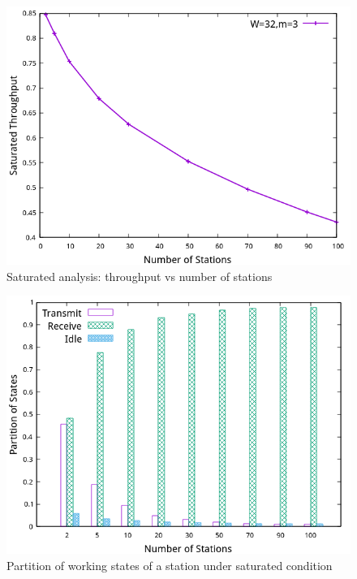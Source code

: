 \vspace*{0.5cm}

\begin{figure}[!h]
\centering
\includegraphics[scale=0.85]{./figure/chp1/n_throughput.png}
\caption{Saturated analysis: throughput vs number of stations}
\label{fig_thp_legacy}
\end{figure}
\vspace*{0.5cm}

\begin{figure}[!h]
\centering
\includegraphics[scale=0.85]{./figure/chp1/n_state_partition.png}
\caption{Partition of working states of a station under saturated condition}
\label{fig_part_state}
\end{figure}

